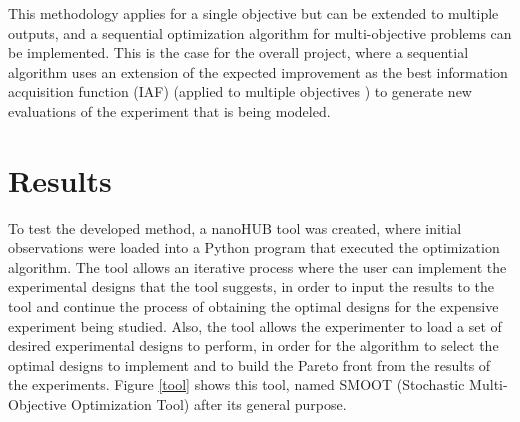 \documentclass{article}
\begin{document}
This methodology applies for a single objective but can be extended to multiple outputs, and a sequential optimization algorithm for multi-objective problems can be implemented. This is the case for the overall project, where a sequential algorithm uses an extension of the expected improvement as the best information acquisition function (IAF)\cite{Jones2001} (applied to multiple objectives \cite{wagner2010expected}) to generate new evaluations of the experiment that is being modeled.

\section{Results}

To test the developed method, a nanoHUB tool was created, where initial observations were loaded into a Python program that executed the optimization algorithm. The tool allows an iterative process where the user can implement the experimental designs that the tool suggests, in order to input the results to the tool and continue the process of obtaining the optimal designs for the expensive experiment being studied. Also, the tool allows the experimenter to load a set of desired experimental designs to perform, in order for the algorithm to select the optimal designs to implement and to build the Pareto front from the results of the experiments. Figure \ref{tool} shows this tool, named SMOOT (Stochastic Multi-Objective Optimization Tool) after its general purpose.
\end{document}
